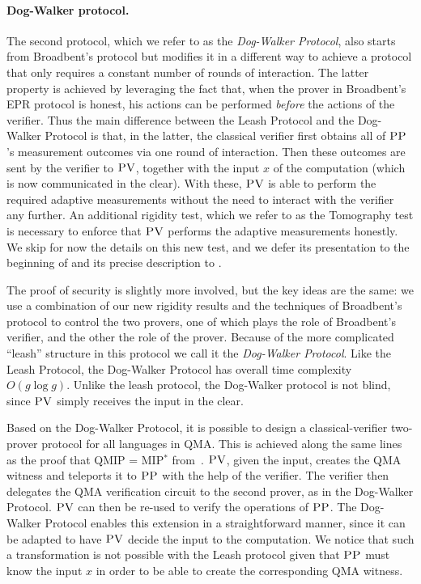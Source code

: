 \documentclass{toc}
\newcommand{\pv}{\textsc{PV}}
\newcommand{\pp}{\textsc{PP}}
\begin{document}
\paragraph{Dog-Walker protocol.} %
The second protocol, which we refer to as the \emph{Dog-Walker Protocol}, also starts from Broadbent's protocol but modifies it in a
different way to achieve a protocol that only requires a constant number of rounds of
interaction. 
The latter property is achieved by leveraging the fact that, when the prover in Broadbent's EPR protocol is honest, his actions can be performed \emph{before} the actions of the verifier.
Thus the main difference between the Leash Protocol and the Dog-Walker Protocol is that, in the latter, the classical verifier first obtains all of $\pp$'s measurement outcomes via one round of interaction. Then these outcomes are sent by the verifier to $\pv$, together with the input $x$ of the computation (which is now communicated in the clear). With these, $\pv$ is able to perform the required adaptive measurements without the need to interact with the verifier any further. An additional rigidity test, which we refer to as the Tomography test is necessary to enforce that $\pv$ performs the adaptive measurements honestly. We skip for now the details on this new test, and we defer its presentation to the beginning of  and its precise description to .

The proof of security is slightly more involved, but the key ideas are the same: we use a combination of our new rigidity results and the techniques of Broadbent's protocol to control the two provers, one of which plays the role of Broadbent's verifier, and the other the role of the prover. Because of the more complicated ``leash'' structure in this protocol we call it the \emph{Dog-Walker Protocol}. 
 Like the Leash Protocol, the Dog-Walker Protocol has overall time complexity $O(g\log g)$. Unlike the leash protocol, the Dog-Walker protocol is not blind, since $\pv$ simply receives the input in the clear.



Based on the Dog-Walker Protocol, it is possible to design a classical-verifier  two-prover protocol for all languages in QMA. This is achieved along the same lines as the proof that QMIP = MIP$^*$ from~\cite{reichardt2012classical}. $\pv$, given the input, creates the QMA witness and teleports it to $\pp$ with the help of the verifier. The verifier then delegates the QMA verification circuit to the second prover, as in the Dog-Walker Protocol. $\pv$ can then be re-used to verify the operations of $\pp$. The Dog-Walker Protocol enables this extension in a straightforward manner, since it can be adapted to have $\pv$ decide the input to the computation. We notice that such a transformation is not possible with the Leash protocol given that $\pp$ must know the input $x$ in order to be able to create the corresponding QMA witness.
\end{document}
